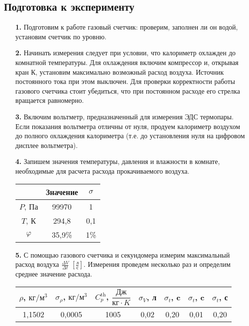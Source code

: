 \documentclass[a4paper,12pt]{article}
\begin{document}
	\subsection*{Подготовка к эксперименту}
	\begin{enumerate}
		\item [\textbf{1.}] Подготовим к работе газовый счетчик: проверим, заполнен ли он водой, установим счетчик по уровню.
		\item [\textbf{2.}] Начинать измерения следует при условии, что калориметр охлажден до комнатной температуры. Для охлаждения включим компрессор и, открывая кран К, установим максимально возможный расход воздуха. Источник постоянного тока при этом выключен. Для проверки корректности работы газового счетчика стоит убедиться, что при постоянном расходе его стрелка вращается равномерно.
		\item [\textbf{3.}] Включим вольтметр, предназначенный для измерения ЭДС термопары. Если показания вольтметра отличны от нуля, продуем калориметр воздухом до полного охлаждения калориметра (т.е. до установления нуля на цифровом дисплее вольтметра).
		\item [\textbf{4.}]Запишем значения температуры, давления и влажности в комнате, необходимые для расчета расхода прокачиваемого воздуха.
		\begin{center}
			\begin{tabular}{|c|c|c|}
				\hline
				& Значение & $\sigma$ \\ \hline
				$P$, Па    & 99970   & 1        \\ \hline
				$T$, К     & 294,8   & 0,1      \\ \hline
				$\varphi$  & 35,9\%  & 1\%      \\ \hline
			\end{tabular}
		\end{center}
		\item [\textbf{5.}] С помощью газового счетчика и секундомера измерим максимальный расход воздуха $\frac{\Delta V}{\Delta t}$ $\left[\frac{л}{с}\right]$. Измерения проведем несколько раз и определим среднее значение расхода.
		\begin{center}
			\begin{tabular}{|c|c|c|c|c|c|c|}\hline
                $\rho$, $кг/м^3$ & $\sigma_{\rho}$, $кг/м^3$ & $C_p^{\text{th}}$, $\dfrac{Дж}{кг \cdot K}$ & $\sigma_V$, л & $\sigma_t$, c  & $\sigma_t$, c & $\sigma_t$, с \\\hline
                1,1502 & 0,0005 & 1005  & 0,02   & 0,20  & 0,01 & 0,20\\\hline
                \end{tabular}
			

\end{center}
\end{enumerate}
\end{document}

